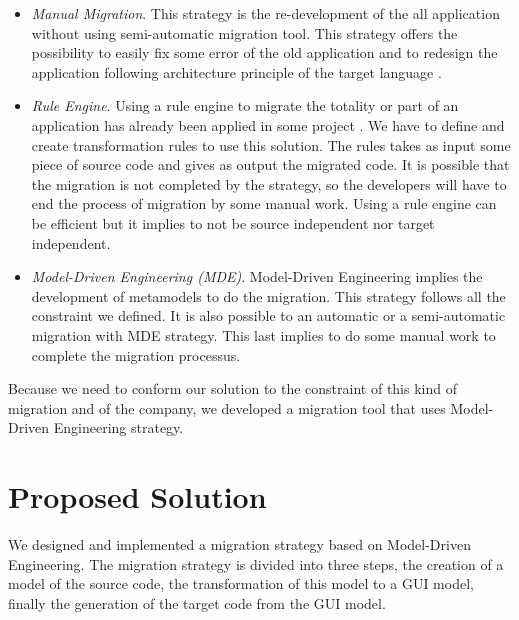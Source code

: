 \documentclass[conference]{IEEEtran}
\begin{document}
    \begin{itemize}
        
        \item \emph{Manual Migration}. This strategy is the re-development of the all application
            without using semi-automatic migration tool.
        This strategy offers the possibility to easily fix some error of the old application and to 
            redesign the application following architecture principle of the target language \citep{fleurey2007model}.
    
        \item \emph{Rule Engine}. Using a rule engine to migrate the totality or part of an application has
                already been applied in some project \citep{brant2010extreme, feldman1991availability, terwilliger2012automatic}.
            We have to define and create transformation rules to use this solution.
            The rules takes as input some piece of source code and gives as output the migrated code.
            It is possible that the migration is not completed by the strategy, so the developers will have to
                end the process of migration by some manual work.
            Using a rule engine can be efficient but it implies to not be source independent nor target independent.
    
        \item \emph{Model-Driven Engineering (MDE)}. Model-Driven Engineering implies the development of metamodels to do the migration.
            This strategy follows all the constraint we defined.
            It is also possible to an automatic or a semi-automatic migration with MDE strategy.
            This last implies to do some manual work to complete the migration processus.
    
    \end{itemize}
    
    Because we need to conform our solution to the constraint of this kind of migration
        and of the company, we developed a migration tool that uses Model-Driven Engineering strategy. 
    
    \section{Proposed Solution}
    \label{sec:contribution}
    
    We designed and implemented a migration strategy based on Model-Driven Engineering.
    The migration strategy is divided into three steps, 
        the creation of a model of the source code,
        the transformation of this model to a GUI model, 
        finally the generation of the target code from the GUI model. 
\end{document}
